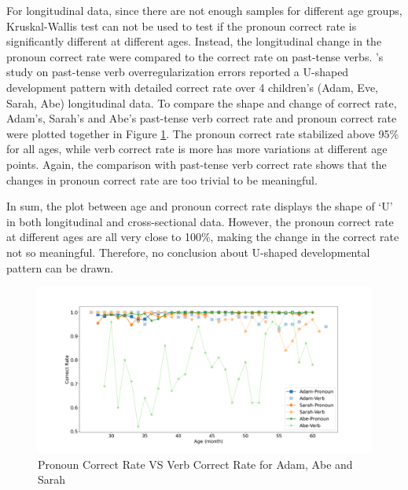 For longitudinal data, since there are not enough samples for different age groups,  Kruskal-Wallis test can not be used to test if the pronoun correct rate is significantly different at different ages. Instead, the longitudinal change in the pronoun correct rate were compared to the correct rate on past-tense verbs. \cite{marcus1992overregularization}'s study on past-tense verb overregularization errors reported a U-shaped development pattern with detailed correct rate over 4 children's (Adam, Eve, Sarah, Abe) longitudinal data. To compare the shape and change of correct rate, Adam's, Sarah's and Abe's past-tense verb correct rate and pronoun correct rate were plotted together in Figure \ref{fig:3}. The pronoun correct rate stabilized above 95\% for all ages, while verb correct rate is more has more variations at different age points. Again, the comparison with past-tense verb correct rate shows that the changes in pronoun correct rate are too trivial to be meaningful.  

In sum, the plot between age and pronoun correct rate displays the shape of `U' in both longitudinal and cross-sectional data. However, the pronoun correct rate at different ages are all very close to 100\%, making the change in the correct rate not so meaningful. Therefore, no conclusion about U-shaped developmental pattern can be drawn. 
 

\FloatBarrier
\begin{figure}[h]
\includegraphics[scale = 0.35, width = \linewidth]{graph/AgeVerb.png}
\vspace{-3em}
\caption{Pronoun Correct Rate VS Verb Correct Rate for Adam, Abe and Sarah}
\label{fig:3}
\end{figure}
\FloatBarrier



